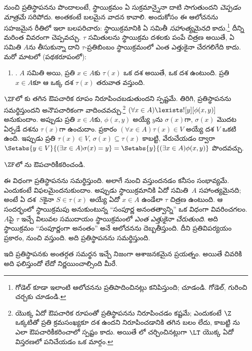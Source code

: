 \documentclass[../../../include/open-logic-section]{subfiles}
\begin{document}
\stagesinex{} నుంచి ప్రతిస్థాపనను పొందాలంటే, స్థాయిక్రమం
ఏ సుక్రమాన్నైనా దాటి సాగుతుందని \emph{చెప్పడం మాత్రమే} సరిపోదు.
అంతకంటే బలమైన వాదన కావాలి. అందుకోసం \cite{Shoenfield:AST} ఈ ఆలోచనను సహజమైన రీతిలో ఇలా బలపరిచారు: స్థాయిక్రమానికి ఏ సమితీ \emph{సహాంత్యమైనది} కాదు.\footnote{గోడెల్ కూడా ఇలాంటి ఆలోచనను ప్రతిపాదించినట్లు కనిపిస్తుంది; \citet[p.~223]{Potter2004} చూడండి. గోడెల్, \citeauthor{Shoenfield:AST} గురించి చర్చకు \citet[90--5]{Incurvati2020} చూడండి.} దీన్ని మరింత వివరంగా చెప్పవచ్చు. $\tau$ సమితులను స్థాయిక్రమ దశలకు పంపే చిత్రణ అయితే, ఏ సమితి $A$ను తీసుకున్నా దాని $\tau$-ప్రతిబింబం స్థాయిక్రమంలో ఎంత ఎత్తుకైనా చేరగలిగేది కాదు. మరో మాటలో (పథకరూపంలో):
\begin{enumerate}
	\item[] \stagescofin. $A$ సమితి అయి, ప్రతి $x \in A$కు $\tau(x)$ ఒక దశ అయితే, ఒక దశ ఉంటుంది. ప్రతి $x \in A$కూ ఆ ఒక్క దశ $\tau(x)$ తరువాత వస్తుంది.
\end{enumerate}
$\ZF$లో \stagescofin{}కు తగిన ఔపచారిక రూపం నిరూపించబడుతుందని స్పష్టమే. తిరిగి, \stagescofin{} ప్రతిస్థాపనను సమర్థిస్తుందని అనౌపచారికంగా వాదించవచ్చు.\footnote{\stagescofin{} యొక్క ఏదో ఔపచారిక రూపంతో ప్రతిస్థాపనను నిరూపించడం కష్టమే; ఎందుకంటే $\Z$ ఒక్కటితో ప్రతి క్రమసంఖ్యకూ దశ ఉందని నిరూపించడానికి తగిన బలం లేదు, కాబట్టి \stagescofin{}ను ఎలా ఔపచారికీకరించాలో స్పష్టం కాదు. అయితే లో చర్చించినట్లుగా $\LT$ యొక్క ఏదో విస్తరణలో పనిచేయడం ఒక మార్గం.} $(\forall x \in A)\lexists![y][\phi(x,y)]$ అనుకుందాం. అప్పుడు ప్రతి $x \in A$కు, $\phi(x,y)$ అయ్యే $y$ను $\sigma(x)$గా, $\sigma(x)$ మొదట ఏర్పడే దశను $\tau(x)$గా ఉంచుదాం. \stagescofin{} ప్రకారం $(\forall x \in A)\tau(x)\in V$ అయ్యే దశ $V$ ఒకటి ఉంది. ఇప్పుడు ప్రతి $\tau(x) \in V$, $\sigma(x) \subseteq \tau(x)$ కాబట్టి, వేరుచేయడం ద్వారా $\Setabs{y
\in V}{(\exists x \in A)\sigma(x) = y} = \Setabs{y}{(\exists x \in
A)\phi(x,y)}$ పొందవచ్చు.

\begin{prob}
	$\ZF$లో \stagescofin{}ను ఔపచారికీకరించండి.
\end{prob}

ఈ విధంగా \stagescofin{} ప్రతిస్థాపనను సమర్థిస్తుంది. అలాగే \stagesinex{} నుంచి \stagescofin{} వస్తుందనడం కనీసం సంభావ్యమే. ఎందుకంటే \stagescofin{} విఫలమైందనుకుందాం. అప్పుడు స్థాయిక్రమానికి ఏదో సమితి~$A$ సహాంత్యమైనది; అంటే ఏ దశ~$S$కైనా $S \in \tau(x)$ అయ్యే ఏదో $x \in A$ ఉండేలా $\tau$ చిత్రణ ఉంటుంది. ఆ సందర్భంలో స్థాయిక్రమపు అనుకుంటున్న ``సంపూర్ణ అనంతత్వాన్ని'' ఒక విధంగా వివరించగలం. $A$పై $\tau$ ఇచ్చే విలువల సముదాయం స్థాయిక్రమంలో \emph{ఎంత ఎత్తుకైనా చేరుతుంది}. అది స్థాయిక్రమం ``సంపూర్ణంగా అనంతం'' అనే ఆలోచనను దెబ్బతీస్తుంది. దీని ప్రతివిపర్యయం ప్రకారం, \stagesinex{} నుంచి \stagescofin{} వస్తుంది. అది ప్రతిస్థాపనను సమర్థిస్తుంది.

ఇది ప్రతిస్థాపనకు అంతర్గత సమర్థన ఇచ్చే నిజంగా ఆశాజనకమైన ప్రయత్నం. అయితే చివరికి అది ఫలిస్తుందో లేదో నిర్ణయించాల్సింది మీరే.
\end{document}
